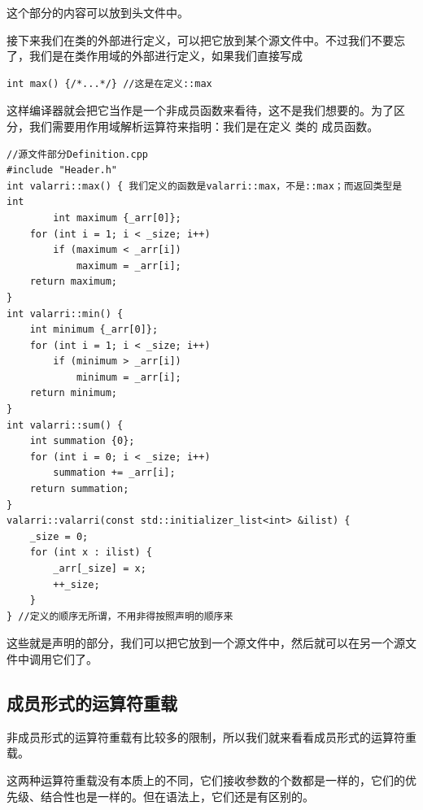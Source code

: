 这个部分的内容可以放到头文件中。\par
接下来我们在类的外部进行定义，可以把它放到某个源文件中。不过我们不要忘了，我们是在类作用域的外部进行定义，如果我们直接写成
\begin{lstlisting}
int max() {/*...*/} //这是在定义::max
\end{lstlisting}
这样编译器就会把它当作是一个非成员函数来看待，这不是我们想要的。为了区分，我们需要用作用域解析运算符来指明：我们是在定义 \lstinline@valarri@ 类的 \lstinline@max@ 成员函数。
\begin{lstlisting}
//源文件部分Definition.cpp
#include "Header.h"
int valarri::max() { 我们定义的函数是valarri::max，不是::max；而返回类型是int
        int maximum {_arr[0]};
    for (int i = 1; i < _size; i++)
        if (maximum < _arr[i])
            maximum = _arr[i];
    return maximum;
}
int valarri::min() {
    int minimum {_arr[0]};
    for (int i = 1; i < _size; i++)
        if (minimum > _arr[i])
            minimum = _arr[i];
    return minimum;
}
int valarri::sum() {
    int summation {0};
    for (int i = 0; i < _size; i++)
        summation += _arr[i];
    return summation;
}
valarri::valarri(const std::initializer_list<int> &ilist) {
    _size = 0;
    for (int x : ilist) {
        _arr[_size] = x;
        ++_size;
    }
} //定义的顺序无所谓，不用非得按照声明的顺序来
\end{lstlisting}
这些就是声明的部分，我们可以把它放到一个源文件中，然后就可以在另一个源文件中调用它们了。\par
\subsection*{成员形式的运算符重载}
非成员形式的运算符重载有比较多的限制，所以我们就来看看成员形式的运算符重载。\par
这两种运算符重载没有本质上的不同，它们接收参数的个数都是一样的，它们的优先级、结合性也是一样的。但在语法上，它们还是有区别的。\par
